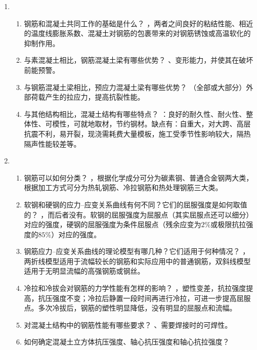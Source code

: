 \documentclass{article}
\begin{document}
\begin{enumerate}
    \item
          \begin{enumerate}[1.]
              \item 钢筋和混凝土共同工作的基础是什么？
                    ，两者之间良好的粘结性能、相近的温度线膨胀系数、混凝土对钢筋的包裹带来的对钢筋锈蚀或高温软化的抑制作用。
              \item 与素混凝土相比，钢筋混凝土梁有哪些优势？
                    、变形能力，并使其在破坏前能预警。
              \item 与钢筋混凝土梁相比，预应力混凝土梁有哪些优势？
                    （全部或大部分）外部荷载产生的拉应力，提高抗裂性能。
              \item 与其他结构相比，混凝土结构有哪些特点？
                    ：良好的耐久性、耐火性、整体性、可模性，可就地取材，节约钢材。缺点有：自重大，对大跨、高层抗震不利，易开裂，现浇需耗费大量模板，施工受季节性影响较大，隔热隔声性能较差等。
          \end{enumerate}
    \item \begin{enumerate}[1.]
              \item 钢筋可以如何分类？
                    ，根据化学成分可分为碳素钢、普通合金钢两大类，根据加工方式可分为热轧钢筋、冷拉钢筋和热处理钢筋三大类。
              \item 软钢和硬钢的应力--应变关系曲线有何不同？它们的屈服强度是如何取值的？
                    ，而后者没有。软钢的屈服强度为屈服点（其实屈服点还可以细分）对应的强度，硬钢的屈服强度为条件屈服点（残余应变为$2\%$或极限抗拉强度的$85\%$）对应的强度。
              \item 钢筋应力--应变关系曲线的理论模型有哪几种？它们适用于何种情况？
                    ，两折线模型适用于流幅较长的钢筋和实际应用中的普通钢筋，双斜线模型适用于无明显流幅的高强钢筋或钢丝。
              \item 冷拉和冷拔会对钢筋的力学性能有怎样的影响？
                    ，塑性变差，抗拉强度提高，抗压强度不变；冷拉后静置一段时间再进行冷拉，可进一步提高屈服点。多次冷拔后，钢筋的塑性明显降低，没有明显的屈服点和流幅。
              \item 对混凝土结构中的钢筋性能有哪些要求？
                    、需要焊接时的可焊性。
              \item 如何确定混凝土立方体抗压强度、轴心抗压强度和轴心抗拉强度？

\end{enumerate}
\end{enumerate}
\end{document}
